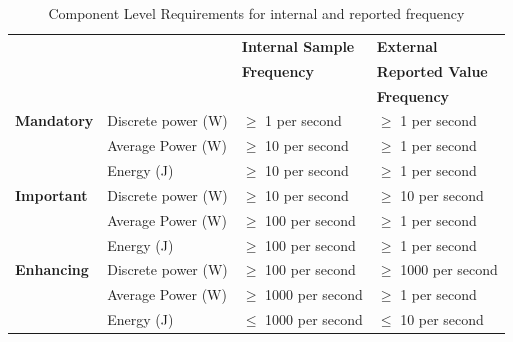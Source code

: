 \begin{table}
\caption{Component Level Requirements for internal and reported frequency}
\label{tab:comlevel}
\begin{tabular}{|p{3.0cm}|p{3.5cm}|p{3.5cm}|p{3.5cm}|} \hline
& & \textbf{Internal Sample}&\textbf{External}\\ 
& & \textbf{Frequency}&\textbf{Reported Value}\\ 
& & & \textbf{Frequency}\\ \hline

\textbf{Mandatory} &
Discrete power (W)&
\mbox{$ \ge $} 1 per second &
\mbox{$ \ge $} 1 per second \\

& 
Average Power (W) &
\mbox{$ \ge $} 10 per second &
\mbox{$ \ge $} 1 per second \\

& 
Energy (J) &
\mbox{$ \ge $} 10 per second &
\mbox{$ \ge $} 1 per second \\ \hline

\textbf{Important} & 
Discrete power (W)&
\mbox{$ \ge $} 10 per second &
\mbox{$ \ge $} 10 per second \\

& 
Average Power (W) &
\mbox{$ \ge $} 100 per second &
\mbox{$ \ge $} 1 per second \\

& 
Energy (J) &
\mbox{$ \ge $} 100 per second &
\mbox{$ \ge $} 1 per second \\ \hline 

\textbf{Enhancing} & 
Discrete power (W)&
\mbox{$ \ge $} 100 per second &
\mbox{$ \ge $} 1000 per second \\

& 
Average Power (W) &
\mbox{$ \ge $} 1000 per second &
\mbox{$ \ge $} 1 per second \\

& 
Energy (J) &
\mbox{$ \le $} 1000 per second &
\mbox{$ \le $} 10 per second \\ \hline

\end{tabular}
\end{table}


